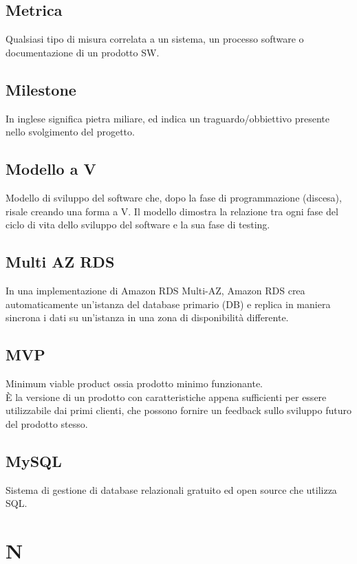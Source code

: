 \documentclass{classes/base}
\begin{document}
        \subsection*{Metrica}
        Qualsiasi tipo di misura correlata a un sistema, un processo software  o  documentazione  di  un  prodotto  SW. 

        \subsection*{Milestone}
        In inglese significa pietra miliare, ed indica un traguardo/obbiettivo presente nello svolgimento del progetto.
        
        \subsection*{Modello a V}
        Modello di sviluppo del software che, dopo la fase di programmazione (discesa), risale creando una forma a V. Il modello dimostra la relazione tra ogni fase del ciclo di vita dello sviluppo del software e la sua fase di testing.

        \subsection*{Multi AZ RDS} 
        In una implementazione di Amazon RDS Multi-AZ, Amazon RDS crea automaticamente un’istanza del database primario (DB) e replica in maniera sincrona i dati su un’istanza in una zona di disponibilità differente.

        \subsection*{MVP}
        Minimum viable product ossia prodotto minimo funzionante. \\
        È la versione di un prodotto con caratteristiche appena sufficienti per essere utilizzabile dai primi clienti, che possono fornire un feedback sullo sviluppo futuro del prodotto stesso.

        \subsection*{MySQL}
        Sistema di gestione di database relazionali gratuito ed open source che utilizza SQL.
        \newpage  
    \section{N}
\end{document}
